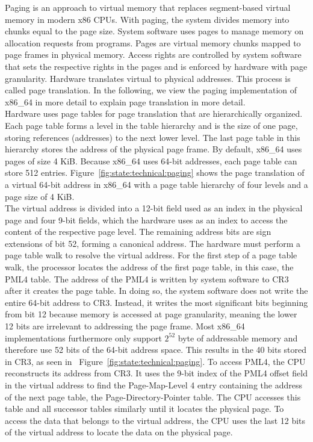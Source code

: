 Paging is an approach to virtual memory that replaces segment-based virtual
memory in modern x86 CPUs. With paging, the system divides memory into chunks
equal to the page size. System software uses pages to manage memory on
allocation requests from programs. Pages are virtual memory chunks mapped to
page frames in physical memory. Access rights are controlled by system software
that sets the respective rights in the pages and is enforced by hardware with
page granularity. Hardware translates virtual to physical addresses. This
process is called page translation. In the following, we view the paging
implementation of x86\_64 in more detail to explain page translation in more
detail.\\

Hardware uses page tables for page translation that are hierarchically
organized. Each page table forms a level in the table hierarchy and is the size
of one page, storing references (addresses) to the next lower level. The last
page table in this hierarchy stores the address of the physical page frame. By
default, x86\_64 uses pages of size 4 KiB. Because x86\_64 uses 64-bit
addresses, each page table can store 512 entries.
Figure~\ref{fig:state:technical:paging} shows the page translation of a virtual
64-bit address in x86\_64 with a page table hierarchy of four levels and a page
size of 4 KiB. \\

The virtual address is divided into a 12-bit field used as an index in the
physical page and four 9-bit fields, which the hardware uses as an index to
access the content of the respective page level. The remaining address bits are
sign extensions of bit 52, forming a canonical address. The hardware must
perform a page table walk to resolve the virtual address. For the first step of
a page table walk, the processor locates the address of the first page table, in
this case, the PML4 table. The address of the PML4 is written by system software
to CR3 after it creates the page table. In doing so, the system software does
not write the entire 64-bit address to CR3. Instead, it writes the most
significant bits beginning from bit 12 because memory is accessed at page
granularity, meaning the lower 12 bits are irrelevant to addressing the page
frame. Most x86\_64 implementations furthermore only support $2^{52}$ byte of
addressable memory and therefore use 52 bits of the 64-bit address space. This
results in the 40 bits stored in CR3, as seen in
~Figure~\ref{fig:state:technical:paging}. To access PML4, the CPU reconstructs
its address from CR3. It uses the 9-bit index of the PML4 offset field in the
virtual address to find the Page-Map-Level 4 entry containing the address of the
next page table, the Page-Directory-Pointer table. The CPU accesses this table
and all successor tables similarly until it locates the physical page. To access
the data that belongs to the virtual address, the CPU uses the last 12 bits of
the virtual address to locate the data on the physical page. \\

